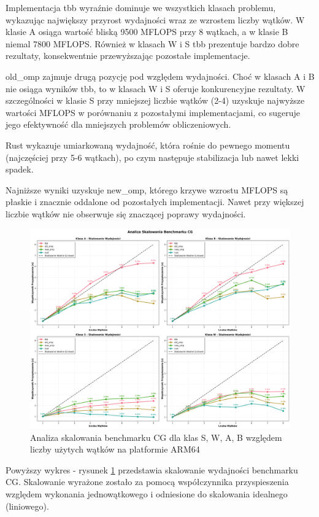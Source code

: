 Implementacja tbb wyraźnie dominuje we wszystkich klasach problemu, wykazując największy przyrost wydajności wraz ze wzrostem liczby wątków. W klasie A osiąga wartość bliską 9500 MFLOPS przy 8 wątkach, a w klasie B niemal 7800 MFLOPS. Również w klasach W i S tbb prezentuje bardzo dobre rezultaty, konsekwentnie przewyższając pozostałe implementacje.

old\_omp zajmuje drugą pozycję pod względem wydajności. Choć w klasach A i B nie osiąga wyników tbb, to w klasach W i S oferuje konkurencyjne rezultaty. W szczególności w klasie S przy mniejszej liczbie wątków (2-4) uzyskuje najwyższe wartości MFLOPS w porównaniu z pozostałymi implementacjami, co sugeruje jego efektywność dla mniejszych problemów obliczeniowych.

Rust wykazuje umiarkowaną wydajność, która rośnie do pewnego momentu (najczęściej przy 5-6 wątkach), po czym następuje stabilizacja lub nawet lekki spadek.

Najniższe wyniki uzyskuje new\_omp, którego krzywe wzrostu MFLOPS są płaskie i znacznie oddalone od pozostałych implementacji. Nawet przy większej liczbie wątków nie obserwuje się znaczącej poprawy wydajności.

\begin{figure}[H]
    \centering
    \includegraphics[width=\textwidth]{analiza/images/parallel/cg/x86/cg_analiza_skalowania.png}
    \caption{Analiza skalowania benchmarku CG dla klas S, W, A, B względem liczby użytych wątków na platformie ARM64}
    \label{cg_analiza_skalowania_x86_64}
\end{figure}
Powyższy wykres - rysunek \ref{cg_analiza_skalowania_x86_64} przedstawia skalowanie wydajności benchmarku CG. Skalowanie wyrażone zostało za pomocą współczynnika przyspieszenia względem wykonania jednowątkowego i odniesione do skalowania idealnego (liniowego).

